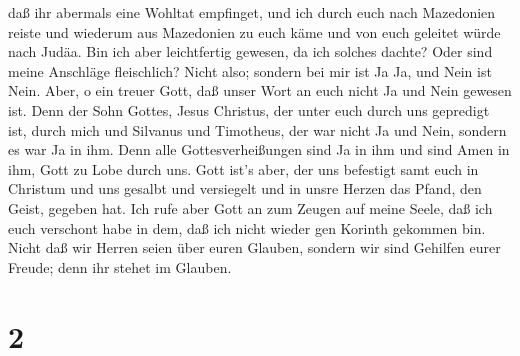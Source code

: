 daß ihr abermals eine Wohltat empfinget,  und ich durch
euch nach Mazedonien reiste und wiederum aus Mazedonien zu euch käme und
von euch geleitet würde nach Judäa.  Bin ich aber
leichtfertig gewesen, da ich solches dachte? Oder sind meine Anschläge
fleischlich? Nicht also; sondern bei mir ist Ja Ja, und Nein ist Nein.
 Aber, o ein treuer Gott, daß unser Wort an euch nicht Ja
und Nein gewesen ist.  Denn der Sohn Gottes, Jesus
Christus, der unter euch durch uns gepredigt ist, durch mich und
Silvanus und Timotheus, der war nicht Ja und Nein, sondern es war Ja in
ihm.  Denn alle Gottesverheißungen sind Ja in ihm und sind
Amen in ihm, Gott zu Lobe durch uns.  Gott ist's aber, der
uns befestigt samt euch in Christum und uns gesalbt  und
versiegelt und in unsre Herzen das Pfand, den Geist, gegeben hat.
 Ich rufe aber Gott an zum Zeugen auf meine Seele, daß ich
euch verschont habe in dem, daß ich nicht wieder gen Korinth gekommen
bin.  Nicht daß wir Herren seien über euren Glauben,
sondern wir sind Gehilfen eurer Freude; denn ihr stehet im Glauben.

\hypertarget{section-1}{%
\section{2}\label{section-1}}


